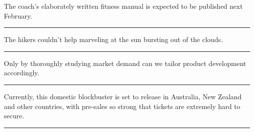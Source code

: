 \documentclass[11pt,a4paper]{article}
\newcommand{\num}[1]{\makebox[1.9em][r]{#1.}\hspace{0.3em}}
\newcommand{\wline}{\noindent\rule{\linewidth}{0.4pt}}
\begin{document}
\vspace{0.35em}\vspace{0.15em}

\begin{minipage}{\linewidth}

\num{9}The coach’s elaborately written fitness manual is expected to be published next February.

\vspace{0.25em}

\wline

\end{minipage}

\begin{minipage}{\linewidth}

\num{10}The hikers couldn’t help marveling at the sun bursting out of the clouds.

\vspace{0.25em}

\wline

\end{minipage}

\begin{minipage}{\linewidth}

\num{11}Only by thoroughly studying market demand can we tailor product development accordingly.

\vspace{0.25em}

\wline

\end{minipage}

\begin{minipage}{\linewidth}

\num{12}Currently, this domestic blockbuster is set to release in Australia, New Zealand and other countries, with pre-sales so strong that tickets are extremely hard to secure.

\vspace{0.25em}

\wline

\end{minipage}
\end{document}
